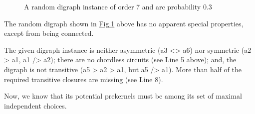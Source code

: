 \documentclass[a4paper,12pt,english]{sphinxhowto}
\let\sphinxpxdimen\pdfpxdimen\else\newdimen\sphinxpxdimen
\begin{document}
\begin{figure}[H]
\centering
\capstart

\noindent\sphinxincludegraphics[width=300\sphinxpxdimen]{{randomLaterality}.png}
\caption{A random digraph instance of order 7 and arc probability 0.3}\label{\detokenize{tutorial:randomlaterality}}\end{figure}

The random digraph shown in \hyperref[\detokenize{tutorial:randomlaterality}]{Fig.\@ \ref{\detokenize{tutorial:randomlaterality}}} above has no apparent special properties, except from being connected.

\begin{sphinxVerbatim}[commandchars=\\\{\},numbers=left,firstnumber=1,stepnumber=1]
 \PYGZbs{}
              
\end{sphinxVerbatim}

The given digraph instance is neither asymmetric (a3 \textless{}\textendash{}\textgreater{} a6) nor symmetric (a2 \textendash{}\textgreater{} a1, a1 \sphinxhyphen{}/\textgreater{} a2); there are no chordless circuits (see Line 5 above); and, the digraph is not transitive (a5 \sphinxhyphen{}\textgreater{} a2 \sphinxhyphen{}\textgreater{} a1, but a5 \sphinxhyphen{}/\textgreater{} a1). More than half of the required transitive closures are missing (see Line 8).

Now, we know that its potential prekernels must be among its set of maximal independent choices.
\end{document}
